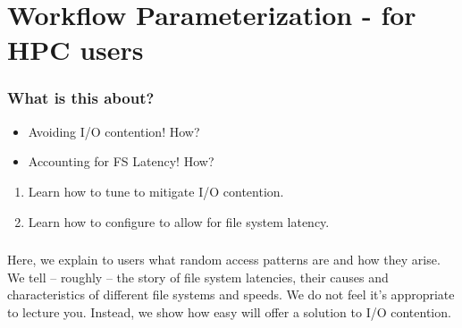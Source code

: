 \section{Workflow Parameterization - for HPC users}
{   
}

\begin{frame}
  \frametitle{What is this about?}
  \begin{question}[Questions]
   	\begin{itemize}
      \item Avoiding I/O contention! How?
      \item Accounting for FS Latency! How?
    \end{itemize}
  \end{question}
   \begin{docs}[Objectives]
   	 \begin{enumerate} 
        \item Learn how to tune \Snakemake{} to mitigate I/O contention.
        \item Learn how to configure \Snakemake{} to allow for file system latency.
    \end{enumerate}
  \end{docs}
\end{frame}

\begin{frame}
	\frametitle{}
	\begin{hint}
		Here, we explain to users what random access patterns are and how they arise.\newline
		We tell -- roughly -- the story of file system latencies, their causes and characteristics of different file systems and speeds.\newline
		\pause
		We do not feel it's appropriate to lecture you. Instead, we show how easy \Snakemake will offer a solution to I/O contention.
	\end{hint}
\end{frame}

